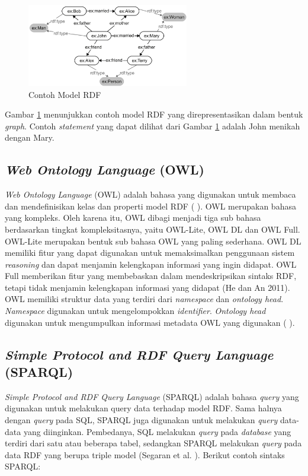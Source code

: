 \begin{figure}[h!] %
	\centering
	\includegraphics[width=200pt]{model_rdf_contoh_gb1.png}
	\caption{Contoh Model RDF}
	\label{fig:model_rdf}
\end{figure}

Gambar \ref{fig:model_rdf} menunjukkan contoh model RDF yang direpresentasikan dalam bentuk \textit{graph}.  Contoh \textit{statement} yang dapat dilihat dari Gambar \ref{fig:model_rdf} adalah John menikah dengan Mary.

\subsection*{\textit{Web Ontology Language} (OWL)}

\textit{Web Ontology Language} (OWL) adalah bahasa yang digunakan untuk membaca dan mendefinisikan kelas dan properti model RDF (\citeauthor{SEGARAB2009} \cite*{SEGARAB2009}). OWL merupakan bahasa yang kompleks. Oleh karena itu, OWL dibagi menjadi tiga sub bahasa berdasarkan tingkat kompleksitasnya, yaitu OWL-Lite, OWL DL dan OWL Full. OWL-Lite merupakan bentuk sub bahasa OWL yang paling sederhana. OWL DL memiliki fitur yang dapat digunakan untuk memaksimalkan penggunaan sistem \textit{reasoning} dan dapat menjamin kelengkapan informasi yang ingin didapat. OWL Full memberikan fitur yang membebaskan dalam mendeskripsikan sintaks RDF, tetapi tidak menjamin kelengkapan informasi yang didapat (He dan An 2011). OWL memiliki struktur data yang terdiri dari \textit{namespace} dan \textit{ontology head}. \textit{Namespace} digunakan untuk mengelompokkan \textit{identifier}. \textit{Ontology head} digunakan untuk mengumpulkan informasi metadata OWL yang digunakan (\citeauthor{HEG2010} \cite*{HEG2010}).

\subsection*{\textit{Simple Protocol and RDF Query Language} (SPARQL)}

\textit{Simple Protocol and RDF Query Language} (SPARQL) adalah bahasa \textit{query} yang digunakan untuk melakukan query data terhadap model RDF. Sama halnya dengan \textit{query} pada SQL, SPARQL juga digunakan untuk melakukan \textit{query} data-data yang diinginkan. Pembedanya, SQL melakukan \textit{query} pada \textit{database} yang terdiri dari satu atau beberapa tabel, sedangkan SPARQL melakukan \textit{query} pada data RDF yang berupa triple model (Segaran et al. \citeauthor{SEGARAB2009} \cite*{SEGARAB2009}). Berikut contoh sintaks SPARQL:
\\

